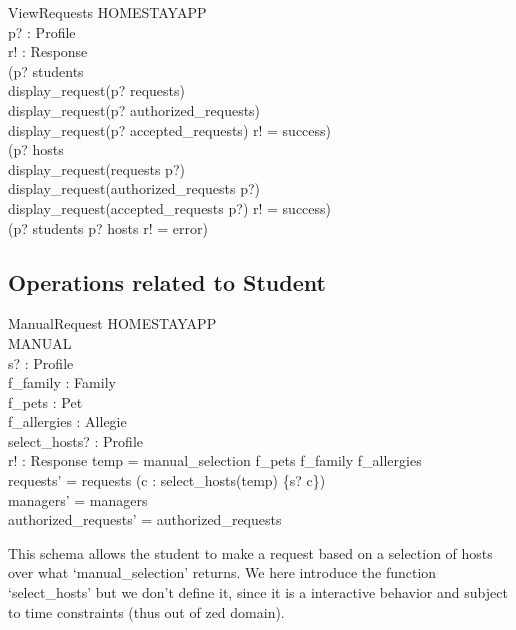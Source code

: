 \documentclass[11pt]{article}
\begin{document}
\begin{schema}{ViewRequests}
	\Xi HOMESTAYAPP\\
	p? : Profile\\
	r! : Response\\
\where
	(p? \in \dom students \wedge\\
								\indent display\_request(p? \dres requests) \wedge\\
								\indent display\_request(p? \dres authorized\_requests)\\
								\indent display\_request(p? \dres accepted\_requests) \wedge r! = success) \vee\\
	(p? \in \dom hosts \wedge\\
							\indent	display\_request(requests \rres p?) \wedge\\
							\indent	display\_request(authorized\_requests \rres p?) \wedge\\
							\indent	display\_request(accepted\_requests \rres p?) \wedge r! = success) \vee\\
	(p? \not\in \dom students \wedge p? \not\in \dom hosts \wedge r! = error)
\end{schema}


\subsection*{Operations related to Student}

\begin{schema}{ManualRequest}
	\Delta HOMESTAYAPP\\
	\Xi MANUAL\\
	s? : Profile\\
	f\_family : \power Family\\
	f\_pets : \power Pet\\
	f\_allergies : \power Allegie\\
	select\_hosts? : \power Profile\\
	r! : Response
\where
	temp = manual\_selection f\_pets f\_family f\_allergies\\
	requests' = requests \cup (\forall c : select\_hosts(temp) \bullet \{s? \mapsto c\})\\
	managers' = managers\\
	authorized_requests' = authorized_requests\\
\end{schema}
This schema allows the student to make a request based on a selection of hosts over what `manual\_selection' returns. We here introduce the function
`select\_hosts' but we don't define it, since it is a interactive behavior and subject to time constraints (thus out of zed domain).
\end{document}

